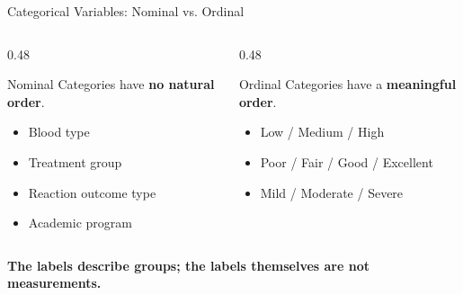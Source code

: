 \documentclass[aspectratio=169]{beamer}
\begin{document}
\begin{frame}{Categorical Variables: Nominal vs. Ordinal}
  \begin{columns}[T]
    \begin{column}{0.48\textwidth}
      \begin{block}{Nominal}
        Categories have \textbf{no natural order}.
        \begin{itemize}
          \item Blood type
          \item Treatment group
          \item Reaction outcome type
          \item Academic program
        \end{itemize}
      \end{block}
    \end{column}
    \begin{column}{0.48\textwidth}
      \begin{block}{Ordinal}
        Categories have a \textbf{meaningful order}.
        \begin{itemize}
          \item Low / Medium / High
          \item Poor / Fair / Good / Excellent
          \item Mild / Moderate / Severe
        \end{itemize}
      \end{block}
    \end{column}
  \end{columns}
  \vspace{0.2cm}
  \centering
  \textbf{The labels describe groups; the labels themselves are not measurements.}
\end{frame}

\end{document}
